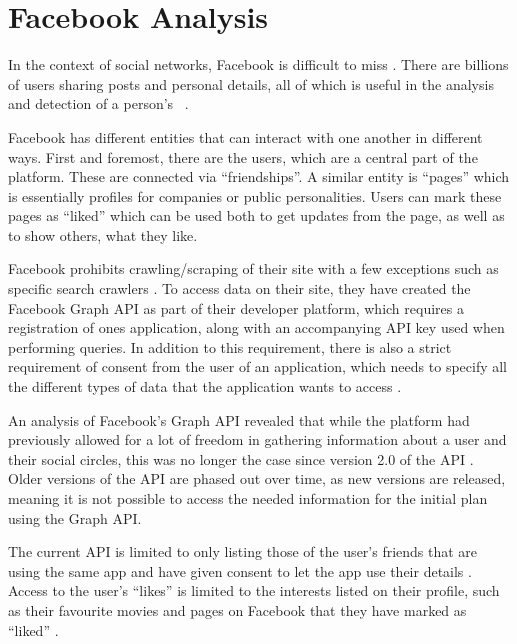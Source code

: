 \section{Facebook Analysis}\label{sec:facebook-analysis}
In the context of social networks, Facebook is difficult to miss \citep{FacebookPopularity}.
There are billions of users sharing posts and personal details, all of which is useful in the analysis and
detection of a person's \fb\ .\nl

Facebook has different entities that can interact with one another in different ways.
First and foremost, there are the users, which are a central part of the
platform. These are connected via ``friendships''.
A similar entity is ``pages'' which is essentially profiles for companies or
public personalities.
Users can mark these pages as ``liked'' which can be used both to get updates
from the page, as well as to show others, what they like.\nl

Facebook prohibits crawling/scraping of their site with a few exceptions such as
specific search crawlers \citep{FacebookRobotsTxt}.
To access data on their site, they have created the Facebook Graph API as part
of their developer platform, which requires a registration of ones application, along with an accompanying API key used when performing queries.
In addition to this requirement, there is also a strict requirement of consent
from the user of an application, which needs to specify all the different types
of data that the application wants to access \citep{FacebookGraphApiAccessTokens}.\nl

An analysis of Facebook's Graph API \citep{FacebookGraphApiDocumentation} revealed that while the platform had
previously allowed for a lot of freedom in gathering information about a user
and their social circles, this was no longer the case since version 2.0 of the
API \citep{FacebookChangesInGraphTwoPointOh}.
Older versions of the API are phased out over time, as new versions are released, meaning it is not possible to access
the needed information for the initial plan using the Graph
API.\nl

The current API is limited to only listing those of the user's friends that are using the same app and have given
consent to let the app use their details \citep{FacebookChangesInGraphTwoPointOh}.
Access to the user's ``likes'' is limited to the interests listed on their profile, such as their favourite movies and
pages on Facebook that they have marked as ``liked''
\citep{FacebookGraphApiUserLikes} \citep{FacebookGraphApiUserEdges}.\nl


